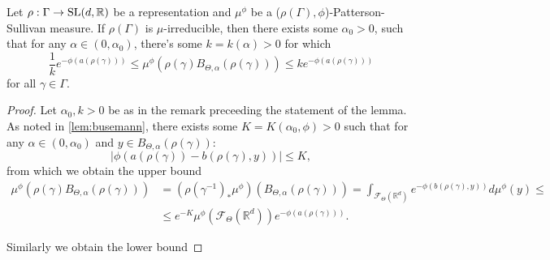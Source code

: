 \documentclass{report}
\begin{document}
\begin{lemma}
    Let $\rho:\Gamma \to \operatorname{{\mathrm{SL}}}(d, \mathbb R)$ be a representation and $\mu^\phi$ be a ($\rho(\Gamma), \phi$)-Patterson-Sullivan measure.
    If $\rho(\Gamma)$ is $\mu$-irreducible, then there exists some $\alpha_0 > 0$, such that for any $\alpha \in (0, \alpha_0)$, there's some $k = k(\alpha) > 0$ for which
    \[
        \frac{1}{k} e^{-\phi(a(\rho(\gamma)))} 
        \leq 
        \mu^\phi(\rho(\gamma) B_{\Theta, \alpha}(\rho(\gamma))) 
        \leq
        k e^{-\phi(a(\rho(\gamma)))} 
    \]
    for all $\gamma \in \Gamma$. 
\end{lemma}
\begin{proof}
    Let $\alpha_0, k > 0$ be as in the remark preceeding the statement of the lemma.
    As noted in \cref{lem:busemann}, there exists some $K = K(\alpha_0, \phi) > 0$ such that for any $\alpha \in (0, \alpha_0)$ and $y \in B_{\Theta, \alpha}(\rho(\gamma))$:
    \[
        |\phi(a(\rho(\gamma)) - b(\rho(\gamma), y))| \leq K,
    \]
    from which we obtain the upper bound
    \begin{align*}
        \mu^\phi(\rho(\gamma) B_{\Theta, \alpha}(\rho(\gamma))) &=
        (\rho(\gamma^{-1})_*\mu^\phi)(B_{\Theta, \alpha}(\rho(\gamma))) =
        \int_{\mathcal F_\Theta(\mathbb R^d)} e^{-\phi(b(\rho(\gamma), y))} d\mu^\phi(y)\leq\\
        &\leq
        e^{-K} \mu^\phi(\mathcal F_\Theta (\mathbb R^d)) e^{-\phi(a(\rho(\gamma)))}.
    \end{align*}
    
    Similarly we obtain the lower bound
\end{proof}

\appendix
\end{document}
